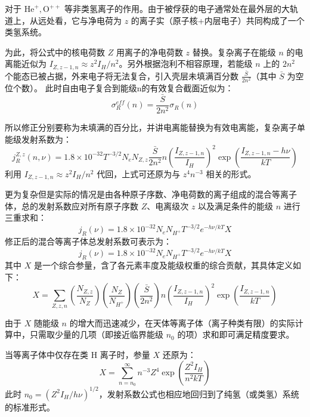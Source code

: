 对于 $\text{He}^+, \text{O}^{++}$ 等非类氢离子的作用。由于被俘获的电子通常处在最外层的大轨道上，从远处看，它与净电荷为 $z$ 的离子实（原子核+内层电子）共同构成了一个类氢系统。

为此，将公式中的核电荷数 $Z$ 用离子的净电荷数 $z$ 替换。复杂离子在能级 $n$ 的电离能近似为 $I_{Z, z-1, n} \approx z^2 I_H / n^2$。另外根据泡利不相容原理，若能级 $n$ 上的 $2n^2$ 个能态已被占据，外来电子将无法复合，引入壳层未填满百分数 $\frac{\bar{S}}{2n^2}$（其中 $\bar{S}$ 为空位个数）。
此时自由电子复合到能级n的有效复合截面近似为：
\begin{equation}
    \sigma_R^{eff}(n) = \frac{\bar{S}}{2n^2}\sigma_R(n) \nonumber
\end{equation}

所以修正分别要称为未填满的百分比，并讲电离能替换为有效电离能，复杂离子单能级发射系数为：
\begin{equation}
    j_R^{Z,z}(n, \nu) = 1.8 \times 10^{-32} T^{-3/2} N_e N_{Z,z} \frac{\bar{S}}{2n^2} n \left( \frac{I_{Z, z-1, n}}{I_H} \right)^2 \exp \left( \frac{I_{Z, z-1, n} - h\nu}{kT} \right) \nonumber
\end{equation}
利用 $I_{Z, z-1, n} \approx z^2 I_H / n^2$ 代回，上式可还原为与 $z^4 n^{-3}$ 相关的形式。

更为复杂但是实际的情况是由各种原子序数、净电荷数的离子组成的混合等离子体，总的发射系数应对所有原子序数 $Z$、电离级次 $z$ 以及满足条件的能级 $n$ 进行三重求和：
\begin{equation}
    j_R(\nu) = 1.8 \times 10^{-32} N_e N_{H^+} T^{-3/2} e^{-h\nu / kT} X
\end{equation}
修正后的混合等离子体总发射系数可表示为：
\begin{equation}
    j_R(\nu) = 1.8 \times 10^{-32} N_e N_{H^+} T^{-3/2} e^{-h\nu / kT} X
\end{equation}
其中 $X$ 是一个综合参量，含了各元素丰度及能级权重的综合贡献，其具体定义如下：
\begin{equation}
    X = \sum_{Z,z,n} \left( \frac{N_{Z,z}}{N_Z} \right) \left( \frac{N_Z}{N_{H^+}} \right) \left( \frac{\bar{S}}{2n^2} \right) n \left( \frac{I_{Z, z-1, n}}{I_H} \right)^2 \exp \left( \frac{I_{Z, z-1, n}}{kT} \right)
\end{equation}

由于 $X$ 随能级 $n$ 的增大而迅速减少，在天体等离子体（离子种类有限）的实际计算中，只需取少量的几项（即接近临界能级 $n_0$ 的项）求和即可满足精度要求。

当等离子体中仅存在类 H 离子时，参量 $X$ 还原为：
\begin{equation}
    X = \sum_{n=n_0}^{\infty} n^{-3} Z^4 \exp \left( \frac{Z^2 I_H}{n^2 kT} \right) \nonumber
\end{equation}
此时 $n_0 = (Z^2 I_H / h\nu)^{1/2}$，发射系数公式也相应地回归到了纯氢（或类氢）系统的标准形式。

